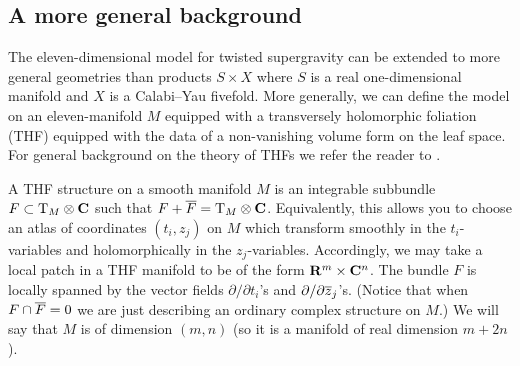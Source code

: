 

\subsection{A more general background}
\label{s:thfmflds}
The eleven-dimensional model for twisted supergravity can be extended to more general geometries than products $S \times X$ where $S$ is a real one-dimensional manifold and $X$ is a Calabi--Yau fivefold.
More generally, we can define the model on an eleven-manifold $M$ equipped with a transversely holomorphic foliation (THF) equipped with the data of a non-vanishing volume form on the leaf space.
For general background on the theory of THFs we refer the reader to \cite{DuchampKalka, KamberTondeur, Rawnsley}.

A THF structure on a smooth manifold $M$ is an integrable subbundle $F \subset \T_M \otimes \C$ such that $F + \Bar{F} = \T_M \otimes \C$.
Equivalently, this allows you to choose an atlas of coordinates $(t_i, z_j)$ on $M$ which transform smoothly in the $t_i$-variables and holomorphically in the $z_j$-variables. 
Accordingly, we may take a local patch in a THF manifold to be of the form $\R^m \times \C^n$.
The bundle $F$ is locally spanned by the vector fields $\partial / \partial t_i$'s and $\del/\del \zbar_j$'s.
(Notice that when $F \cap \Bar{F} = 0$ we are just describing an ordinary complex structure on $M$.)
We will say that $M$ is of dimension $(m,n)$ (so it is a manifold of real dimension $m + 2n$).

